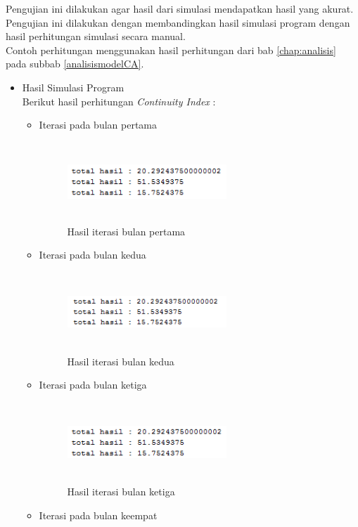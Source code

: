 Pengujian ini dilakukan agar hasil dari simulasi mendapatkan hasil yang akurat. Pengujian ini dilakukan dengan membandingkan hasil simulasi program dengan hasil perhitungan simulasi secara manual.\\
Contoh perhitungan menggunakan hasil perhitungan dari bab \ref{chap:analisis} pada subbab \ref{analisismodelCA}.\\
\begin{itemize}
\item Hasil Simulasi Program\\
	Berikut hasil perhitungan \textit{Continuity Index} :\\
	\begin{itemize}
		\item Iterasi pada bulan pertama
		
	\begin{figure} [H]
	\centering  
	\includegraphics[width=6cm, height=3cm]{hasilIterasi0} 
		\caption[Hasil Iterasi bulan pertama]{Hasil iterasi bulan pertama}
	\label{hasilIterasi0} 
\end{figure}
		\item Iterasi pada bulan kedua
		
	\begin{figure} [H]
	\centering  
	\includegraphics[width=6cm, height=3cm]{hasilIterasi1} 
		\caption[Hasil Iterasi bulan kedua]{Hasil iterasi bulan kedua}
	\label{hasilIterasi1} 
\end{figure}
		\item Iterasi pada bulan ketiga
		
	\begin{figure} [H]
	\centering  
	\includegraphics[width=6cm, height=3cm]{hasilIterasi2} 
		\caption[Hasil Iterasi bulan ketiga]{Hasil iterasi bulan ketiga}
	\label{hasilIterasi2} 
\end{figure}
		\item Iterasi pada bulan keempat
		

\end{itemize}
\end{itemize}
